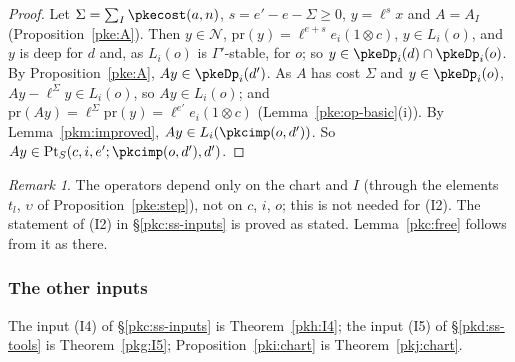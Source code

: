 \documentclass[10pt]{amsart}
\theoremstyle{definition}
\theoremstyle{remark}
\newtheorem{remark}[theorem]{Remark}
\newcommand{\Q}{\mathbb Q}
\begin{document}
\begin{proof}
Let $\Sigma=\sum_I\pkecost(a,n)$, $s=e'-e-\Sigma\ge0$, $y=\ell^sx$ and $A=A_I$ (Proposition~\ref{pke:A}). Then
$y\in\mathcal N$, $\mathrm{pr}(y)=\ell^{e+s}e_i(1\otimes c)$, $y\in L_i(o)$, and $y$ is deep for $d$ and, as
$L_i(o)$ is $\Gamma'$-stable, for $o$; so $y\in\pkeDp_i(d)\cap\pkeDp_i(o)$. By Proposition~\ref{pke:A}, $Ay\in
\pkeDp_i(d')$. As $A$ has cost $\Sigma$ and $y\in\pkeDp_i(o)$, $Ay-\ell^\Sigma y\in L_i(o)$, so $Ay\in L_i(o)$;
and $\mathrm{pr}(Ay)=\ell^\Sigma\mathrm{pr}(y)=\ell^{e'}e_i(1\otimes c)$ (Lemma~\ref{pke:op-basic}(i)). By
Lemma~\ref{pkm:improved}, $Ay\in L_i(\pkcimp(o,d'))$. So $Ay\in\pkcPt_S(c,i,e';\pkcimp(o,d'),d')$.
\end{proof}

\begin{remark}\label{pke:rem-use}
The operators depend only on the chart and $I$ (through the elements $t_l$, $\upsilon$ of
Proposition~\ref{pke:step}), not on $c$, $i$, $o$; this is not needed for (I2). The statement of (I2) in
\S\ref{pkc:ss-inputs} is proved as stated. Lemma~\ref{pkc:free} follows from it as there.
\end{remark}

\subsubsection{The other inputs}\label{pke:ss-open}

The input (I4) of \S\ref{pkc:ss-inputs} is Theorem~\ref{pkh:I4}; the input (I5) of \S\ref{pkd:ss-tools}
is Theorem~\ref{pkg:I5}; Proposition~\ref{pki:chart} is Theorem~\ref{pkj:chart}.



\providecommand{\auO}{\mathcal O}
\providecommand{\auQlb}{\overline{\Q}_\ell}
\providecommand{\panot}[1]{\par\smallskip{\raggedright\noindent\textbf{[Not proved here:} #1\textbf{]}\par}\smallskip}
\providecommand{\pkpA}{A_{\mathrm{inf}}}
\providecommand{\pkpW}{W(C^\flat)}
\providecommand{\pkpAmb}{\mathbb A}
\providecommand{\pknBp}{B^+_{\mathrm{dR}}}
\providecommand{\pknB}{B_{\mathrm{dR}}}
\providecommand{\pknMinf}{\mathfrak M_{\mathrm{inf}}}
\providecommand{\pknK}{\mathcal K_0}
\providecommand{\pkfAm}{A_{\max}}
\providecommand{\pkfAo}{A_{\max}^{\circ}}
\providecommand{\pkfBp}{B^+}
\providecommand{\pkfSB}{\mathfrak S_B}
\providecommand{\pkcPt}{\mathrm{Pt}}
\providecommand{\pkgAN}{\pkpA\mathcal N}
\providecommand{\pkgP}{\mathcal P}
\providecommand{\pkgC}{\mathcal C}
\providecommand{\pkgV}{\mathcal V}
\providecommand{\pkgSh}{\widehat{\mathfrak S}}
\providecommand{\pkgstd}{\mathrm{std}}
\end{document}
